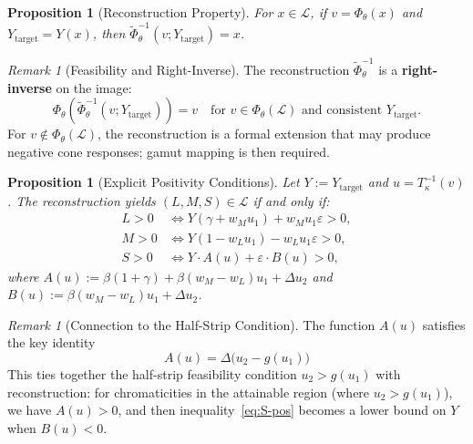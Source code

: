 \documentclass[11pt]{article}
\theoremstyle{plain}
\newtheorem{proposition}[theorem]{Proposition}
\theoremstyle{definition}
\theoremstyle{remark}
\newtheorem{remark}[theorem]{Remark}
\begin{document}
\begin{proposition}[Reconstruction Property]
\label{prop:reconstruction}
For $x \in \mathcal{L}$, if $v = \Phi_\theta(x)$ and $Y_{\mathrm{target}} = Y(x)$, then $\widetilde{\Phi}_\theta^{-1}(v; Y_{\mathrm{target}}) = x$.
\end{proposition}

\begin{remark}[Feasibility and Right-Inverse]
The reconstruction $\widetilde{\Phi}_\theta^{-1}$ is a \textbf{right-inverse} on the image:
\begin{equation}
\Phi_\theta(\widetilde{\Phi}_\theta^{-1}(v; Y_{\mathrm{target}})) = v \quad \text{for } v \in \Phi_\theta(\mathcal{L}) \text{ and consistent } Y_{\mathrm{target}}.
\end{equation}
For $v \notin \Phi_\theta(\mathcal{L})$, the reconstruction is a formal extension that may produce negative cone responses; gamut mapping is then required.
\end{remark}

\begin{proposition}[Explicit Positivity Conditions]
\label{prop:positivity}
Let $Y := Y_{\mathrm{target}}$ and $u = T_\kappa^{-1}(v)$. The reconstruction yields $(L, M, S) \in \mathcal{L}$ if and only if:
\begin{align}
L > 0 &\iff Y(\gamma + w_M u_1) + w_M u_1 \varepsilon > 0, \label{eq:L-pos}\\
M > 0 &\iff Y(1 - w_L u_1) - w_L u_1 \varepsilon > 0, \label{eq:M-pos}\\
S > 0 &\iff Y \cdot A(u) + \varepsilon \cdot B(u) > 0, \label{eq:S-pos}
\end{align}
where $A(u) := \beta(1+\gamma) + \beta(w_M - w_L)u_1 + \Delta u_2$ and $B(u) := \beta(w_M - w_L)u_1 + \Delta u_2$.
\end{proposition}

\begin{remark}[Connection to the Half-Strip Condition]
The function $A(u)$ satisfies the key identity
\begin{equation}
\boxed{A(u) = \Delta \bigl( u_2 - g(u_1) \bigr)}
\end{equation}
This ties together the half-strip feasibility condition $u_2 > g(u_1)$ with reconstruction: for chromaticities in the attainable region (where $u_2 > g(u_1)$), we have $A(u) > 0$, and then inequality~\eqref{eq:S-pos} becomes a lower bound on $Y$ when $B(u) < 0$.
\end{remark}
\end{document}
